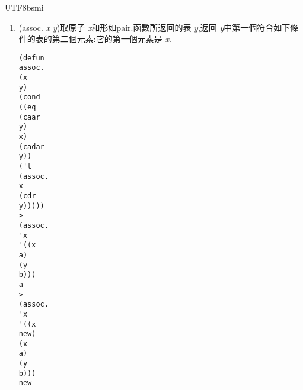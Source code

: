 \documentclass[12pt]{article}
\begin{document}
\begin{CJK}{UTF8}{bsmi}
\begin{enumerate}
應位置的x,y的元素對. 
\begin{verbatim} 
(defun 
pair. 
(x 
y) 
(cond 
((and. 
(null. 
x) 
(null. 
y)) 
'()) 
((and. 
(not. 
(atom 
x)) 
(not. 
(atom 
y))) 
(cons 
(list 
(car 
x) 
(car 
y)) 
(pair. 
(cdr) 
(cdr 
y)))))) 
> 
(pair. 
'(x 
y 
z) 
'(a 
b 
c)) 
((x 
a) 
(y 
b) 
(z 
c)) 
\end{verbatim} 
\item 
(assoc. 
{\it 
x 
y})取原子{\it 
x}和形如pair.函數所返回的表{\it 
y},返回{\it 
y}中第一個符合如下條 
件的表的第二個元素:它的第一個元素是{\it 
x}. 
\begin{verbatim} 
(defun 
assoc. 
(x 
y) 
(cond 
((eq 
(caar 
y) 
x) 
(cadar 
y)) 
('t 
(assoc. 
x 
(cdr 
y))))) 
> 
(assoc. 
'x 
'((x 
a) 
(y 
b))) 
a 
> 
(assoc. 
'x 
'((x 
new) 
(x 
a) 
(y 
b))) 
new 
\end{verbatim} 
\end{enumerate} 

\end{CJK}
\end{document}
